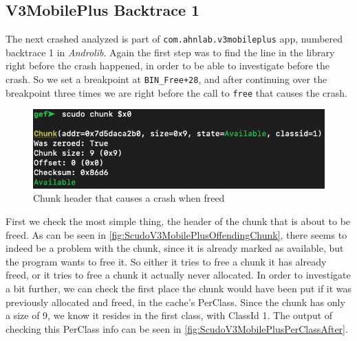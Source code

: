 \documentclass[a4paper,11pt,oneside]{report}
\begin{document}
\subsection{V3MobilePlus Backtrace 1}

The next crashed analyzed is part of \verb|com.ahnlab.v3mobileplus| app,
numbered backtrace 1 in \textit{Androlib}. Again the first step was to find
the line in the library right before the crash happened, in order to be able
to investigate before the crash. So we set a breakpoint at \verb|BIN_Free+28|,
and after continuing over the breakpoint three times we are right before the
call to \verb|free| that causes the crash.

\begin{figure}[h!]
  \centering
  \includegraphics[width=\linewidth]{figures/ScudoV3MobilePlusOffendingChunk.png}
  \caption{Chunk header that causes a crash when freed}
  \label{fig:ScudoV3MobilePlusOffendingChunk}
\end{figure}

First we check the most simple thing, the header of the chunk that is about
to be freed. As can be seen in \autoref{fig:ScudoV3MobilePlusOffendingChunk},
there seems to indeed be a problem with the chunk, since it is already marked
as available, but the program wants to free it. So either it tries to free a
chunk it has already freed, or it tries to free a chunk it actually never
allocated. In order to investigate a bit further, we can check the first place
the chunk would have been put if it was previously allocated and freed, in the
cache's PerClass. Since the chunk has only a size of 9, we know it resides in
the first class, with ClassId 1. The output of checking this PerClass info can
be seen in \autoref{fig:ScudoV3MobilePlusPerClassAfter}.
\end{document}
